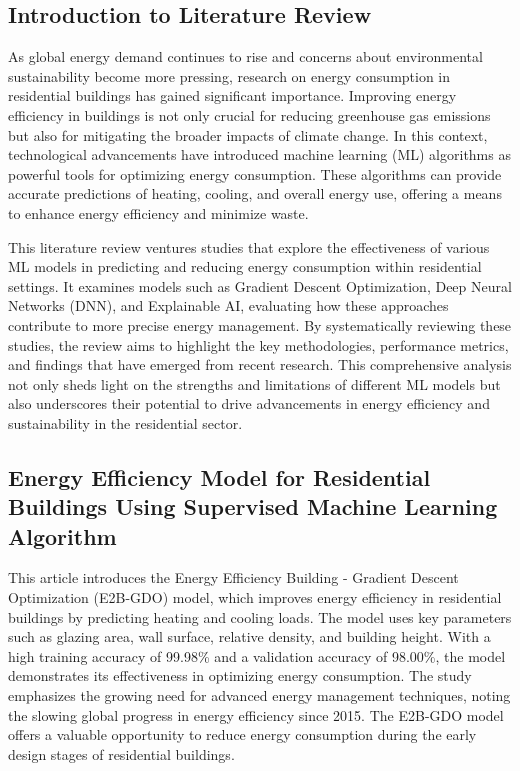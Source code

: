 \documentclass[a4paper, 12pt]{article}
\begin{document}
\subsection{Introduction to Literature Review}
\quad As global energy demand continues to rise and concerns about environmental sustainability become more pressing, research on energy consumption in residential buildings has gained significant importance. Improving energy efficiency in buildings is not only crucial for reducing greenhouse gas emissions but also for mitigating the broader impacts of climate change. In this context, technological advancements have introduced machine learning (ML) algorithms as powerful tools for optimizing energy consumption. These algorithms can provide accurate predictions of heating, cooling, and overall energy use, offering a means to enhance energy efficiency and minimize waste.
\vspace{7pt}

\quad This literature review ventures studies that explore the effectiveness of various ML models in predicting and reducing energy consumption within residential settings. It examines models such as Gradient Descent Optimization, Deep Neural Networks (DNN), and Explainable AI, evaluating how these approaches contribute to more precise energy management. By systematically reviewing these studies, the review aims to highlight the key methodologies, performance metrics, and findings that have emerged from recent research. This comprehensive analysis not only sheds light on the strengths and limitations of different ML models but also underscores their potential to drive advancements in energy efficiency and sustainability in the residential sector.

\subsection{Energy Efficiency Model for Residential Buildings Using Supervised Machine Learning Algorithm}
\quad This article introduces the Energy Efficiency Building - Gradient Descent Optimization (E2B-GDO) model, which improves energy efficiency in residential buildings by predicting heating and cooling loads\cite{Aslam21}. The model uses key parameters such as glazing area, wall surface, relative density, and building height. With a high training accuracy of 99.98\% and a validation accuracy of 98.00\%, the model demonstrates its effectiveness in optimizing energy consumption. The study emphasizes the growing need for advanced energy management techniques, noting the slowing global progress in energy efficiency since 2015. The E2B-GDO model offers a valuable opportunity to reduce energy consumption during the early design stages of residential buildings.
\vspace{7pt}
\end{document}
